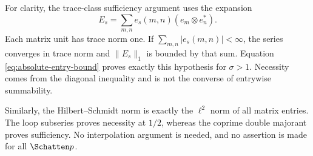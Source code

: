 For clarity, the trace-class sufficiency argument uses the expansion
\[
 E_s=\sum_{m,n}e_s(m,n)(e_m\otimes e_n^*).
\]
Each matrix unit has trace norm one.  If
$\sum_{m,n}|e_s(m,n)|<\infty$, the series converges in trace norm and
$\|E_s\|_1$ is bounded by that sum.  Equation
\eqref{eq:absolute-entry-bound} proves exactly this hypothesis for
$\sigma>1$.  Necessity comes from the diagonal inequality and is not the
converse of entrywise summability.

Similarly, the Hilbert--Schmidt norm is exactly the $\ell^2$ norm of all
matrix entries.  The loop subseries proves necessity at $1/2$, whereas the
coprime double majorant proves sufficiency.  No interpolation argument is
needed, and no assertion is made for all $\Schatten p$.


